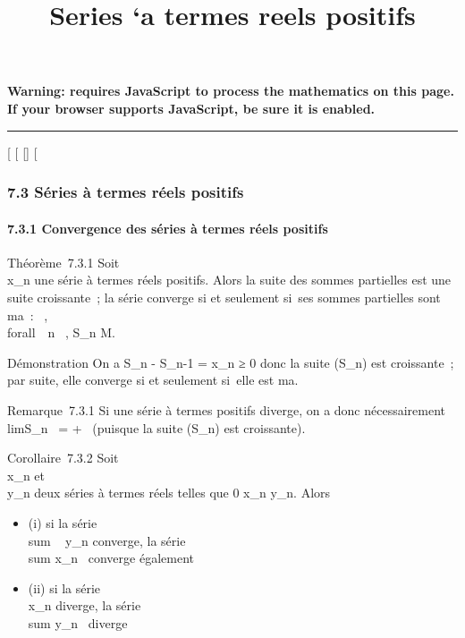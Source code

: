 \documentclass[]{article}
\title{Series `a termes reels positifs}
\author{}
\date{}
\begin{document}
\maketitle

\textbf{Warning: 
requires JavaScript to process the mathematics on this page.\\ If your
browser supports JavaScript, be sure it is enabled.}

\begin{center}\rule{3in}{0.4pt}\end{center}

{[}
{[}
{[}{]}
{[}

\subsubsection{7.3 Séries à termes réels positifs}

\paragraph{7.3.1 Convergence des séries à termes réels positifs}

Théorème~7.3.1 Soit \\\sum
 x\_n une série à termes réels positifs. Alors la suite des
sommes partielles est une suite croissante~; la série converge si et
seulement si~ses sommes partielles sont ma~:
\existsM \in {}~, \\forall~~n \in {}~,
S\_n \leq M.

Démonstration On a S\_n - S\_n-1 = x\_n ≥ 0 donc
la suite (S\_n) est croissante~; par suite, elle converge si et
seulement si~elle est ma.

Remarque~7.3.1 Si une série à termes positifs diverge, on a donc
nécessairement limS\_n~ = +\infty~ (puisque
la suite (S\_n) est croissante).

Corollaire~7.3.2 Soit \\\sum
 x\_n et \\\sum
 y\_n deux séries à termes réels telles que 0 \leq x\_n
\leq y\_n. Alors

\begin{itemize}
\itemsep1pt\parskip0pt
\item
  (i) si la série \\sum ~
  y\_n converge, la série
  \\sum  x\_n~
  converge également
\item
  (ii) si la série \\\sum
   x\_n diverge, la série
  \\sum  y\_n~
  diverge
\end{itemize}
\end{document}
